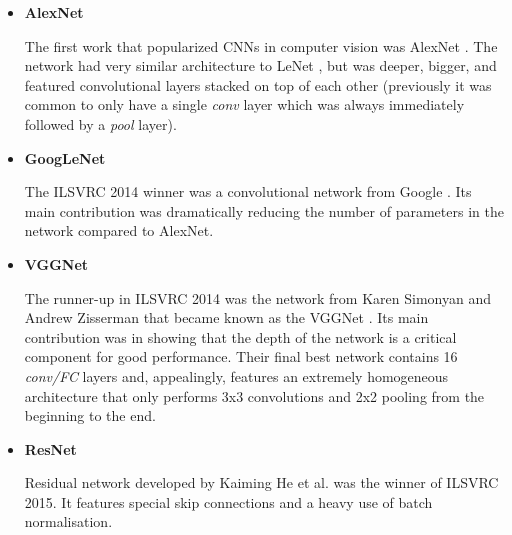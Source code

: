 \begin{itemize}
	\item \textbf{AlexNet}
	
	The first work that popularized CNNs in computer vision was AlexNet \cite{krizhevsky}. The network had very similar architecture to LeNet \cite{lecun}, but was deeper, bigger, and featured convolutional layers stacked on top of each other (previously it was common to only have a single \textit{conv} layer which was always immediately followed by a \textit{pool} layer). \cite{stanford-github}
	
	\item \textbf{GoogLeNet}
	
	The ILSVRC 2014 winner was a convolutional network from Google \cite{szegedy}. Its main contribution was dramatically reducing the number of parameters in the network compared to AlexNet. \cite{stanford-github}
	
	\item \textbf{VGGNet}
	
	The runner-up in ILSVRC 2014 was the network from Karen Simonyan and Andrew Zisserman that became known as the VGGNet \cite{vgg}. Its main contribution was in showing that the depth of the network is a critical component for good performance. Their final best network contains 16 \textit{conv/FC} layers and, appealingly, features an extremely homogeneous architecture that only performs 3x3 convolutions and 2x2 pooling from the beginning to the end. \cite{stanford-github}
	
	\item \textbf{ResNet}
	
  	Residual network developed by Kaiming He et al. \cite{resnet} was the winner of ILSVRC 2015. It features special skip connections and a heavy use of batch normalisation. \cite{stanford-github}
		 
\end{itemize}






